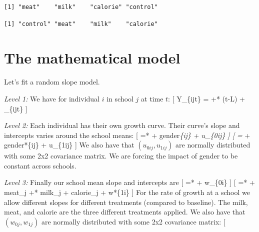 \documentclass[
  letterpaper,
  DIV=11,
  numbers=noendperiod]{scrreprt}
\newenvironment{Shaded}{\begin{snugshade}}{\end{snugshade}}
\newcommand{\AttributeTok}[1]{\textcolor[rgb]{0.49,0.56,0.16}{#1}}
\newcommand{\FunctionTok}[1]{\textcolor[rgb]{0.02,0.16,0.49}{#1}}
\newcommand{\NormalTok}[1]{\textcolor[rgb]{0.00,0.44,0.13}{#1}}
\newcommand{\OtherTok}[1]{\textcolor[rgb]{0.00,0.44,0.13}{#1}}
\newcommand{\SpecialCharTok}[1]{\textcolor[rgb]{0.25,0.44,0.63}{#1}}
\newcommand{\StringTok}[1]{\textcolor[rgb]{0.25,0.44,0.63}{#1}}
\begin{document}
\begin{Shaded}
\end{Shaded}

\begin{verbatim}
[1] "meat"    "milk"    "calorie" "control"
\end{verbatim}

\begin{Shaded}
\end{Shaded}

\begin{verbatim}
[1] "control" "meat"    "milk"    "calorie"
\end{verbatim}

\hypertarget{the-mathematical-model-2}{%
\section{The mathematical model}\label{the-mathematical-model-2}}

Let's fit a random slope model.

\emph{Level 1:} We have for individual \(i\) in school \(j\) at time
\(t\): {[} Y\_\{ijt\} =  +*  (t-L) +
\epsilon\_\{ijt\} {]}

\emph{Level 2:} Each individual has their own growth curve. Their
curve's slope and intercepts varies around the school means: {[}
 =*  +  gender\emph{\{ij\} + u\_\{0ij\}
{]} {[}  =}  +  gender*\{ij\} +
u\_\{1ij\} {]} We also have that \((u_{0ij}, u_{1ij})\) are normally
distributed with some 2x2 covariance matrix. We are forcing the impact
of gender to be constant across schools.

\emph{Level 3:} Finally our school mean slope and intercepts are {[}
 =*  + w\_\{0i\} {]} {[}  =*  +
 meat\_j +*  milk\_j +  calorie\_j + w*\{1i\} {]}
For the rate of growth at a school we allow different slopes for
different treatments (compared to baseline). The milk, meat, and calorie
are the three different treatments applied. We also have that
\((w_{0j}, w_{1j})\) are normally distributed with some 2x2 covariance
matrix: {[}
\end{document}
